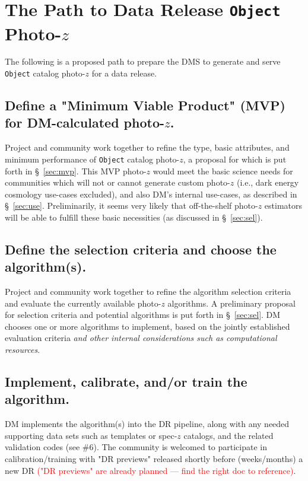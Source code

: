 \documentclass[DM,lsstdraft,toc]{lsstdoc}
\begin{document}
\clearpage
\section{The Path to Data Release {\tt Object} Photo-$z$}\label{sec:dmcalc}

The following is a proposed path to prepare the DMS to generate and serve {\tt Object} catalog photo-$z$ for a data release.

\subsection{Define a "Minimum Viable Product" (MVP) for DM-calculated photo-$z$.}

Project and community work together to refine the type, basic attributes, and minimum performance of {\tt Object} catalog photo-$z$, a proposal for which is put forth in \S~\ref{sec:mvp}.
This MVP photo-$z$ would meet the basic science needs for communities which will not or cannot generate custom photo-$z$ (i.e., dark energy cosmology use-cases excluded), and also DM's internal use-cases, as described in \S~\ref{sec:use}.
Preliminarily, it seems very likely that off-the-shelf photo-$z$ estimators will be able to fulfill these basic necessities (as discussed in \S~\ref{sec:sel}).

\subsection{Define the selection criteria and choose the algorithm(s).}

Project and community work together to refine the algorithm selection criteria and evaluate the currently available photo-$z$ algorithms.
A preliminary proposal for selection criteria and potential algorithms is put forth in \S~\ref{sec:sel}.
DM chooses one or more algorithms to implement, based on the jointly established evaluation criteria {\it and other internal considerations such as computational resources}.

\subsection{Implement, calibrate, and/or train the algorithm.}

DM implements the algorithm(s) into the DR pipeline, along with any needed supporting data sets such as templates or spec-$z$ catalogs, and the related validation codes (see \#6).
The community is welcomed to participate in calibration/training with "DR previews" released shortly before (weeks/months) a new DR \textcolor{red}{("DR previews" are already planned --- find the right doc to reference)}.
\end{document}
